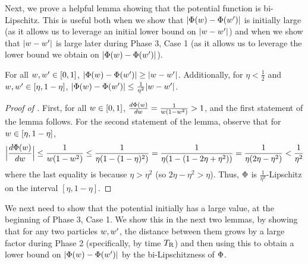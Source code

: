 Next, we prove a helpful lemma showing that the potential function is bi-Lipschitz. This is useful both when we show that $|\Phi(w) - \Phi(w')|$ is initially large (as it allows us to leverage an initial lower bound on $|w - w'|$) and when we show that $|w - w'|$ is large later during Phase 3, Case 1 (as it allows us to leverage the lower bound we obtain on $|\Phi(w) - \Phi(w')|$).

\begin{lemma} \label{lemma:potential_bi_lipschitz}
For all $w, w' \in [0, 1]$, $|\Phi(w) - \Phi(w')| \geq |w - w'|$. Additionally, for $\eta < \frac{1}{2}$ and $w, w' \in [\eta, 1 - \eta]$, $|\Phi(w) - \Phi(w')| \leq \frac{1}{\eta^2} |w - w'|$.
\end{lemma}
\begin{proof}[Proof of ]
First, for all $w \in [0, 1]$, $\frac{d\Phi(w)}{dw} = \frac{1}{w (1 - w^2)} > 1$, and the first statement of the lemma follows. For the second statement of the lemma, observe that for $w \in [\eta, 1 - \eta]$,
\begin{align}
\Big|\frac{d\Phi(w)}{dw}\Big| \leq \frac{1}{w (1 - w^2)} \leq \frac{1}{\eta (1 - (1 - \eta)^2)} = \frac{1}{\eta (1 - (1 - 2\eta + \eta^2))} = \frac{1}{\eta (2\eta - \eta^2)} < \frac{1}{\eta^2}
\end{align}
where the last equality is because $\eta > \eta^2$ (so $2\eta - \eta^2 > \eta$). Thus, $\Phi$ is $\frac{1}{\eta^2}$-Lipschitz on the interval $[\eta, 1 - \eta]$.
\end{proof}

We next need to show that the potential initially has a large value, at the beginning of Phase 3, Case 1. We show this in the next two lemmas, by showing that for any two particles $w, w'$, the distance between them grows by a large factor during Phase 2 (specifically, by time ${T_{\textup{R}}}$) and then using this to obtain a lower bound on $|\Phi(w) - \Phi(w')|$ by the bi-Lipschitzness of $\Phi$.

